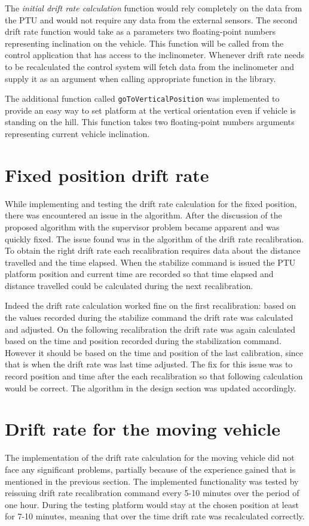 The \textit{initial drift rate calculation} function would rely completely on the data from the PTU and would not require any data from the external sensors. The second drift rate function would take as a parameters two floating-point numbers representing inclination on the vehicle. This function will be called from the control application that has access to the inclinometer. Whenever drift rate needs to be recalculated the control system will fetch data from the inclinometer and supply it as an argument when calling appropriate function in the library.

The additional function called \texttt{goToVerticalPosition} was implemented to provide an easy way to set platform at the vertical orientation even if vehicle is standing on the hill. This function takes two floating-point numbers arguments representing current vehicle inclination. 

\section{Fixed position drift rate}
While implementing and testing the drift rate calculation for the fixed position, there was encountered an issue in the algorithm. After the discussion of the proposed algorithm with the supervisor problem became apparent and was quickly fixed. The issue found was in the algorithm of the drift rate recalibration. To obtain the right drift rate each recalibration requires data about the distance travelled and the time elapsed. When the stabilize command is issued the PTU platform position and current time are recorded so that time elapsed and distance travelled could be calculated during the next recalibration. 

Indeed the drift rate calculation worked fine on the first recalibration: based on the values recorded during the stabilize command the drift rate was calculated and adjusted. On the following recalibration the drift rate was again calculated based on the time and position recorded during the stabilization command. However it should be based on the time and position of the last calibration, since that is when the drift rate was last time adjusted. The fix for this issue was to record position and time after the each recalibration so that following calculation would be correct. The algorithm in the design section was updated accordingly. 
  
\section{Drift rate for the moving vehicle}
The implementation of the drift rate calculation for the moving vehicle did not face any significant problems, partially because of the experience gained that is mentioned in the previous section. The implemented functionality was tested by reissuing drift rate recalibration command every 5-10 minutes over the period of one hour. During the testing platform would stay at the chosen position at least for 7-10 minutes, meaning that over the time drift rate was recalculated correctly.    

